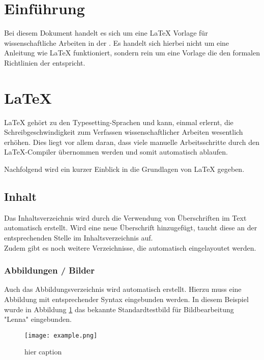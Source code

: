 \section{Einführung}
\label{sec:einfuehrung}

Bei diesem Dokument handelt es sich um eine \LaTeX{} Vorlage für wissenschaftliche Arbeiten in der . Es handelt sich hierbei nicht um eine Anleitung wie \LaTeX{} funktioniert, sondern rein um eine Vorlage die den formalen Richtlinien der  entspricht.

\newpage
\section{\LaTeX}

\LaTeX{} gehört zu den Typesetting-Sprachen und kann, einmal erlernt, die Schreibgeschwindigkeit
zum Verfassen wissenschaftlicher Arbeiten wesentlich erhöhen. Dies liegt vor allem daran, dass viele
manuelle Arbeitsschritte durch den \LaTeX{}-Compiler übernommen werden und somit automatisch ablaufen.

Nachfolgend wird ein kurzer Einblick in die Grundlagen von \LaTeX{} gegeben.

\subsection{Inhalt}

Das Inhaltsverzeichnis wird durch die Verwendung von Überschriften im Text automatisch erstellt.
Wird eine neue Überschrift hinzugefügt, taucht diese an der entsprechenden Stelle im Inhaltsverzeichnis auf.\\

Zudem gibt es noch weitere Verzeichnisse, die automatisch eingelayoutet werden.

\subsubsection{Abbildungen / Bilder}

Auch das Abbildungsverzeichnis wird automatisch erstellt. Hierzu muss eine Abbildung mit
entsprechender Syntax eingebunden werden. In diesem Beispiel wurde in Abbildung
\ref{fig: Schere} das bekannte Standardtestbild für Bildbearbeitung "Lenna" eingebunden.

\begin{figure}[H]
  \centering
  \texttt{[image: example.png]}
  \caption{hier caption}
  \label{fig: Schere}
\end{figure}

